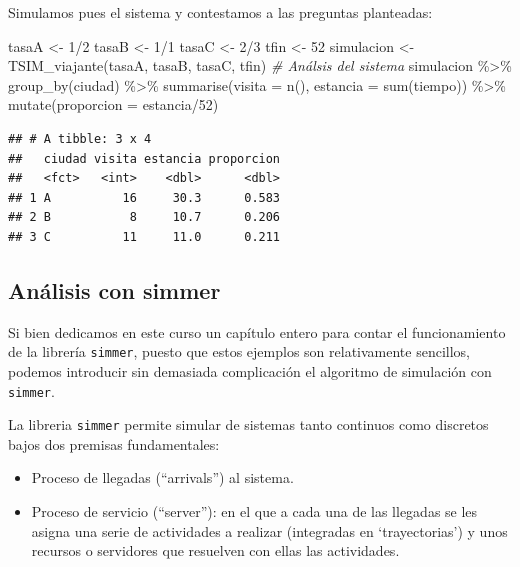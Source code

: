 \documentclass[
]{book}
\newenvironment{Shaded}{\begin{snugshade}}{\end{snugshade}}
\newcommand{\AttributeTok}[1]{\textcolor[rgb]{0.77,0.63,0.00}{#1}}
\newcommand{\CommentTok}[1]{\textcolor[rgb]{0.56,0.35,0.01}{\textit{#1}}}
\newcommand{\DecValTok}[1]{\textcolor[rgb]{0.00,0.00,0.81}{#1}}
\newcommand{\FunctionTok}[1]{\textcolor[rgb]{0.00,0.00,0.00}{#1}}
\newcommand{\NormalTok}[1]{#1}
\newcommand{\OtherTok}[1]{\textcolor[rgb]{0.56,0.35,0.01}{#1}}
\newcommand{\SpecialCharTok}[1]{\textcolor[rgb]{0.00,0.00,0.00}{#1}}
\providecommand{\tightlist}{%
  \setlength{\itemsep}{0pt}\setlength{\parskip}{0pt}}
\theoremstyle{definition}
\theoremstyle{definition}
\theoremstyle{definition}
\theoremstyle{definition}
\theoremstyle{remark}
\begin{document}
Simulamos pues el sistema y contestamos a las preguntas planteadas:

\begin{Shaded}
\begin{Highlighting}[]
\NormalTok{tasaA }\OtherTok{\textless{}{-}} \DecValTok{1}\SpecialCharTok{/}\DecValTok{2}
\NormalTok{tasaB }\OtherTok{\textless{}{-}} \DecValTok{1}\SpecialCharTok{/}\DecValTok{1}
\NormalTok{tasaC }\OtherTok{\textless{}{-}} \DecValTok{2}\SpecialCharTok{/}\DecValTok{3}
\NormalTok{tfin }\OtherTok{\textless{}{-}} \DecValTok{52}
\NormalTok{simulacion }\OtherTok{\textless{}{-}} \FunctionTok{TSIM\_viajante}\NormalTok{(tasaA, tasaB, tasaC, tfin)  }
\CommentTok{\# Análsis del sistema}
\NormalTok{simulacion }\SpecialCharTok{\%\textgreater{}\%} 
  \FunctionTok{group\_by}\NormalTok{(ciudad) }\SpecialCharTok{\%\textgreater{}\%} 
  \FunctionTok{summarise}\NormalTok{(}\AttributeTok{visita =} \FunctionTok{n}\NormalTok{(), }\AttributeTok{estancia =} \FunctionTok{sum}\NormalTok{(tiempo)) }\SpecialCharTok{\%\textgreater{}\%}
  \FunctionTok{mutate}\NormalTok{(}\AttributeTok{proporcion =}\NormalTok{ estancia}\SpecialCharTok{/}\DecValTok{52}\NormalTok{)}
\end{Highlighting}
\end{Shaded}

\begin{verbatim}
## # A tibble: 3 x 4
##   ciudad visita estancia proporcion
##   <fct>   <int>    <dbl>      <dbl>
## 1 A          16     30.3      0.583
## 2 B           8     10.7      0.206
## 3 C          11     11.0      0.211
\end{verbatim}

\hypertarget{anuxe1lisis-con-simmer}{%
\subsection{Análisis con simmer}\label{anuxe1lisis-con-simmer}}

Si bien dedicamos en este curso un capítulo entero para contar el funcionamiento de la librería \texttt{simmer}, puesto que estos ejemplos son relativamente sencillos, podemos introducir sin demasiada complicación el algoritmo de simulación con \texttt{simmer}.

La libreria \texttt{simmer} permite simular de sistemas tanto continuos como discretos bajos dos premisas fundamentales:

\begin{itemize}
\tightlist
\item
  Proceso de llegadas (``arrivals'') al sistema.
\item
  Proceso de servicio (``server''): en el que a cada una de las llegadas se les asigna una serie de actividades a realizar (integradas en `trayectorias') y unos recursos o servidores que resuelven con ellas las actividades.
\end{itemize}
\end{document}
